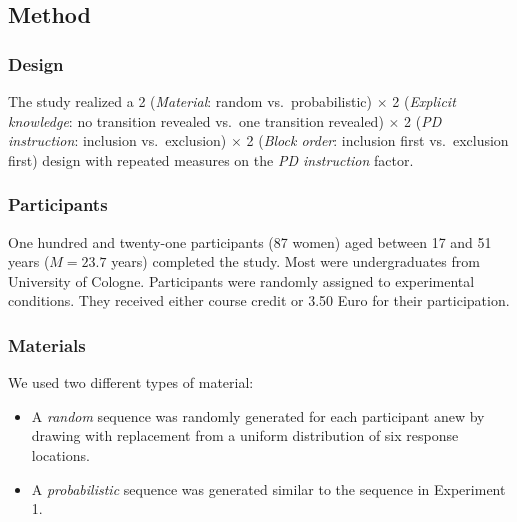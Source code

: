 \documentclass[floatsintext,doc]{apa6}
\providecommand{\tightlist}{%
  \setlength{\itemsep}{0pt}\setlength{\parskip}{0pt}}
\theoremstyle{definition}
\theoremstyle{definition}
\theoremstyle{definition}
\theoremstyle{remark}
\begin{document}
\subsection{Method}\label{method-1}

\subsubsection{Design}\label{design-1}

The study realized a 2 (\emph{Material}: random vs.~probabilistic)
\(\times\) 2 (\emph{Explicit knowledge}: no transition revealed vs.~one
transition revealed) \(\times\) 2 (\emph{PD instruction}: inclusion
vs.~exclusion) \(\times\) 2 (\emph{Block order}: inclusion first
vs.~exclusion first) design with repeated measures on the \emph{PD
instruction} factor.

\subsubsection{Participants}\label{participants-1}

One hundred and twenty-one participants (87 women) aged between 17 and
51 years (\(M = 23.7\) years) completed the study. Most were
undergraduates from University of Cologne. Participants were randomly
assigned to experimental conditions. They received either course credit
or 3.50 Euro for their participation.

\subsubsection{Materials}\label{materials-1}

We used two different types of material:

\begin{itemize}
\tightlist
\item
  A \emph{random} sequence was randomly generated for each participant
  anew by drawing with replacement from a uniform distribution of six
  response locations. 
\item
  A \emph{probabilistic} sequence was generated similar to the sequence
  in Experiment 1.
\end{itemize}
\end{document}
